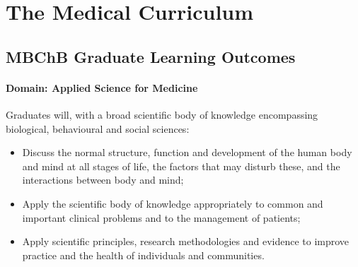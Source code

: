 \documentclass[11pt,fleqn]{book} %
\begin{document}

\chapter{The Medical Curriculum}

\section{MBChB Graduate Learning Outcomes}

\subsubsection{Domain: Applied Science for Medicine}

Graduates will, with a broad scientific body of knowledge encompassing biological, behavioural and social sciences:
\begin{itemize}
\item Discuss the normal structure, function and development of the human body and mind at all stages of life, the factors that may disturb these, and the interactions between body and mind;
\item Apply the scientific body of knowledge appropriately to common and important clinical problems and to the management of patients;
\item Apply scientific principles, research methodologies and evidence to improve practice and the health of individuals and communities. 
\end{itemize}
\end{document}
